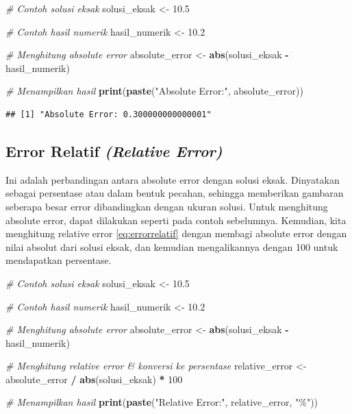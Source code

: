 \documentclass[
]{book}
\newenvironment{Shaded}{\begin{snugshade}}{\end{snugshade}}
\newcommand{\CommentTok}[1]{\textcolor[rgb]{0.56,0.35,0.01}{\textit{#1}}}
\newcommand{\DecValTok}[1]{\textcolor[rgb]{0.00,0.00,0.81}{#1}}
\newcommand{\FloatTok}[1]{\textcolor[rgb]{0.00,0.00,0.81}{#1}}
\newcommand{\FunctionTok}[1]{\textcolor[rgb]{0.13,0.29,0.53}{\textbf{#1}}}
\newcommand{\NormalTok}[1]{#1}
\newcommand{\OtherTok}[1]{\textcolor[rgb]{0.56,0.35,0.01}{#1}}
\newcommand{\SpecialCharTok}[1]{\textcolor[rgb]{0.81,0.36,0.00}{\textbf{#1}}}
\newcommand{\StringTok}[1]{\textcolor[rgb]{0.31,0.60,0.02}{#1}}
\theoremstyle{definition}
\theoremstyle{definition}
\theoremstyle{definition}
\theoremstyle{definition}
\theoremstyle{remark}
\begin{document}
\begin{Shaded}
\begin{Highlighting}[]
\CommentTok{\# Contoh solusi eksak}
\NormalTok{solusi\_eksak }\OtherTok{\textless{}{-}} \FloatTok{10.5}

\CommentTok{\# Contoh hasil numerik}
\NormalTok{hasil\_numerik }\OtherTok{\textless{}{-}} \FloatTok{10.2}

\CommentTok{\# Menghitung absolute error}
\NormalTok{absolute\_error }\OtherTok{\textless{}{-}} \FunctionTok{abs}\NormalTok{(solusi\_eksak }\SpecialCharTok{{-}}\NormalTok{ hasil\_numerik)}

\CommentTok{\# Menampilkan hasil}
\FunctionTok{print}\NormalTok{(}\FunctionTok{paste}\NormalTok{(}\StringTok{"Absolute Error:"}\NormalTok{, absolute\_error))}
\end{Highlighting}
\end{Shaded}

\begin{verbatim}
## [1] "Absolute Error: 0.300000000000001"
\end{verbatim}

\hypertarget{error-relatif-relative-error}{%
\subsection{\texorpdfstring{Error Relatif \emph{(Relative Error)}}{Error Relatif (Relative Error)}}\label{error-relatif-relative-error}}

Ini adalah perbandingan antara absolute error dengan solusi eksak. Dinyatakan sebagai persentase atau dalam bentuk pecahan, sehingga memberikan gambaran seberapa besar error dibandingkan dengan ukuran solusi. Untuk menghitung absolute error, dapat dilakukan seperti pada contoh sebelumnya. Kemudian, kita menghitung relative error \eqref{eq:errorrelatif} dengan membagi absolute error dengan nilai absolut dari solusi eksak, dan kemudian mengalikannya dengan 100 untuk mendapatkan persentase.

\begin{Shaded}
\begin{Highlighting}[]
\CommentTok{\# Contoh solusi eksak}
\NormalTok{solusi\_eksak }\OtherTok{\textless{}{-}} \FloatTok{10.5}

\CommentTok{\# Contoh hasil numerik}
\NormalTok{hasil\_numerik }\OtherTok{\textless{}{-}} \FloatTok{10.2}

\CommentTok{\# Menghitung absolute error}
\NormalTok{absolute\_error }\OtherTok{\textless{}{-}} \FunctionTok{abs}\NormalTok{(solusi\_eksak }\SpecialCharTok{{-}}\NormalTok{ hasil\_numerik)}

\CommentTok{\# Menghitung relative error \& konversi ke persentase}
\NormalTok{relative\_error }\OtherTok{\textless{}{-}}\NormalTok{ absolute\_error }\SpecialCharTok{/} \FunctionTok{abs}\NormalTok{(solusi\_eksak) }\SpecialCharTok{*} \DecValTok{100}  

\CommentTok{\# Menampilkan hasil}
\FunctionTok{print}\NormalTok{(}\FunctionTok{paste}\NormalTok{(}\StringTok{"Relative Error:"}\NormalTok{, relative\_error, }\StringTok{"\%"}\NormalTok{))}
\end{Highlighting}
\end{Shaded}
\end{document}

